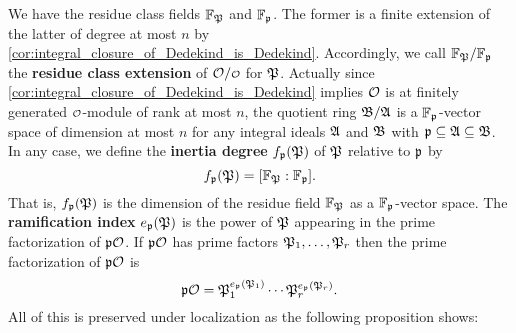     \begin{center}
    \end{center}

    We have the residue class fields $\mathbb{F}_{\mathfrak{P}}$ and $\mathbb{F}_{\mathfrak{p}}$. The former is a finite extension of the latter of degree at most $n$ by \cref{cor:integral_closure_of_Dedekind_is_Dedekind}. Accordingly, we call $\mathbb{F}_{\mathfrak{P}}/\mathbb{F}_{\mathfrak{p}}$ the \textbf{residue class extension} of $\mc{O}/\smc{O}$ for $\mathfrak{P}$. Actually since \cref{cor:integral_closure_of_Dedekind_is_Dedekind} implies $\mathcal{O}$ is at finitely generated $\smc{O}$-module of rank at most $n$, the quotient ring $\mathfrak{B}/\mathfrak{A}$ is a $\mathbb{F}_{\mathfrak{p}}$-vector space of dimension at most $n$ for any integral ideals $\mathfrak{A}$ and $\mathfrak{B}$ with $\mathfrak{p} \subseteq \mathfrak{A} \subseteq \mathfrak{B}$. In any case, we define the \textbf{inertia degree} $f_{\mathfrak{p}}(\mathfrak{P})$ of $\mathfrak{P}$ relative to $\mathfrak{p}$ by
    \[
      f_{\mathfrak{p}}(\mathfrak{P}) = [\mathbb{F}_{\mathfrak{P}}:\mathbb{F}_{\mathfrak{p}}].
    \]
    That is, $f_{\mathfrak{p}}(\mathfrak{P})$ is the dimension of the residue field $\mathbb{F}_{\mathfrak{P}}$ as a $\mathbb{F}_{\mathfrak{p}}$-vector space. The \textbf{ramification index} $e_{\mathfrak{p}}(\mathfrak{P})$ is the power of $\mathfrak{P}$ appearing in the prime factorization of $\mathfrak{p}\mathcal{O}$. If $\mathfrak{p}\mathcal{O}$ has prime factors $\mathfrak{P}_{1},\ldots,\mathfrak{P}_{r}$ then the prime factorization of $\mathfrak{p}\mathcal{O}$ is
    \[
      \mathfrak{p}\mathcal{O} = \mathfrak{P}_{1}^{e_{\mathfrak{p}}(\mathfrak{P}_{1})} \cdots \mathfrak{P}_{r}^{e_{\mathfrak{p}}(\mathfrak{P}_{r})}.
    \]
    All of this is preserved under localization as the following proposition shows:

